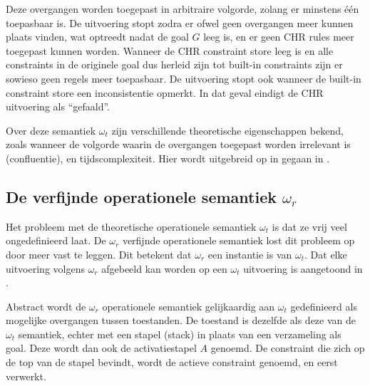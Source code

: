 Deze overgangen worden toegepast in arbitraire volgorde, zolang er minstens \'e\'en toepasbaar is. De uitvoering stopt zodra er ofwel geen overgangen meer kunnen plaats vinden, wat optreedt nadat de goal $G$ leeg is, en er geen CHR rules meer toegepast kunnen worden. Wanneer de CHR constraint store leeg is en alle constraints in de originele goal dus herleid zijn tot built-in constraints zijn er sowieso geen regels meer toepasbaar. De uitvoering stopt ook wanneer de built-in constraint store een inconsistentie opmerkt. In dat geval eindigt de CHR uitvoering als ``gefaald''.

Over deze semantiek $\omega_t$ zijn verschillende theoretische eigenschappen bekend, zoals wanneer de volgorde waarin de overgangen toegepast worden irrelevant is (confluentie), en tijdscomplexiteit. Hier wordt uitgebreid op in gegaan in \cite{tomsphdthesis}.

\subsection{De verfijnde operationele semantiek $\omega_r$}

Het probleem met de theoretische operationele semantiek $\omega_t$ is dat ze vrij veel ongedefinieerd laat. De $\omega_r$ verfijnde operationele semantiek lost dit probleem op door meer vast te leggen. Dit betekent dat $\omega_r$ een instantie is van $\omega_t$. Dat elke uitvoering volgens $\omega_r$ afgebeeld kan worden op een $\omega_t$ uitvoering is aangetoond in \cite{refined}.

Abstract wordt de $\omega_r$ operationele semantiek gelijkaardig aan $\omega_t$ gedefinieerd als mogelijke overgangen tussen toestanden. De toestand is dezelfde als deze van de $\omega_t$ semantiek, echter met een stapel (stack) in plaats van een verzameling als goal. Deze wordt dan ook de activatiestapel $A$ genoemd. De constraint die zich op de top van de stapel bevindt, wordt de actieve constraint genoemd, en eerst verwerkt.

